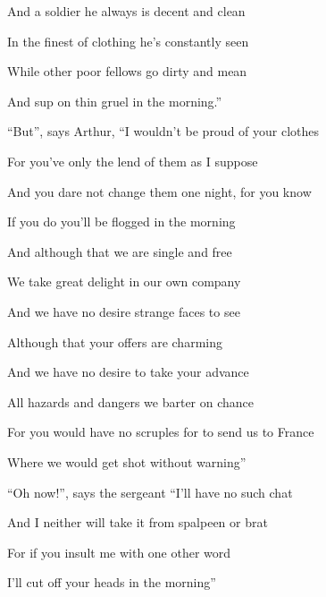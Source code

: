 \documentclass[letterpaper,10pt,english]{sphinxmanual}
\begin{document}
\begin{DUlineblock}{0em}
\item[] And a soldier he always is decent and clean
\item[] In the finest of clothing he’s constantly seen
\item[] While other poor fellows go dirty and mean
\item[] And sup on thin gruel in the morning.”
\end{DUlineblock}

\begin{DUlineblock}{0em}
\item[] “But”, says Arthur, “I wouldn’t be proud of your clothes
\item[] For you’ve only the lend of them as I suppose
\item[] And you dare not change them one night, for you know
\item[] If you do you’ll be flogged in the morning
\end{DUlineblock}

\begin{DUlineblock}{0em}
\item[] And although that we are single and free
\item[] We take great delight in our own company
\item[] And we have no desire strange faces to see
\item[] Although that your offers are charming
\end{DUlineblock}

\begin{DUlineblock}{0em}
\item[] And we have no desire to take your advance
\item[] All hazards and dangers we barter on chance
\item[] For you would have no scruples for to send us to France
\item[] Where we would get shot without warning”
\end{DUlineblock}

\begin{DUlineblock}{0em}
\item[] “Oh now!”, says the sergeant “I’ll have no such chat
\item[] And I neither will take it from spalpeen or brat
\item[] For if you insult me with one other word
\item[] I’ll cut off your heads in the morning”
\end{DUlineblock}
\end{document}
